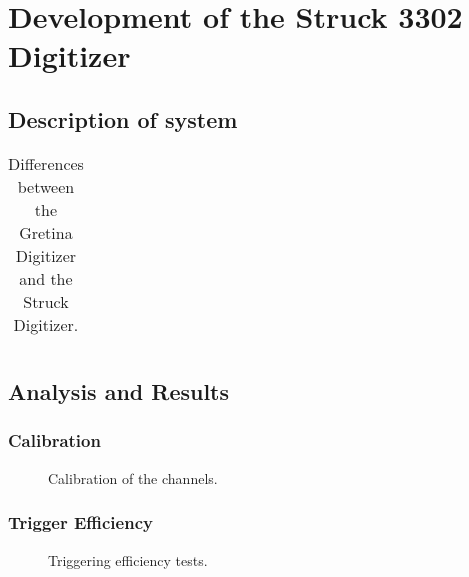 	\section{Development of the Struck 3302 Digitizer}
	
		\subsection{Description of system}
	    
		\begin{table}
			\centering
			\begin{tabular}{l|c|c}
			\end{tabular}
			\caption[Differences between the Gretina Digitizer and the Struck Digitizer]
			{Differences between the Gretina Digitizer and the Struck Digitizer.}
			\label{tab:BeGeSIS3302GretinaDifferences}
		\end{table}	
	      
		\subsection{Analysis and Results}
		\label{sec:DeploymentBeGeSoudanAnalysis}
		
			\subsubsection{Calibration}
			\label{sec:DeploymentBeGeSoudanAnalysisCalibration}    
			
				\begin{figure}
					\centering
					\caption[Calibration of the channels]{Calibration of the channels.}
					\label{fig:BeGeCalibration}
				\end{figure}
		    
		    	\subsubsection{Trigger Efficiency}
			\label{sec:DeploymentBeGeSoudanAnalysisTriggerEfficiency}    
			
				\begin{figure}
					\centering
					\caption[Struck card triggering efficiency tests]{Triggering efficiency tests.}
					\label{fig:BeGeTriggeringEfficiencyTestsVsTime}
				\end{figure}
			
